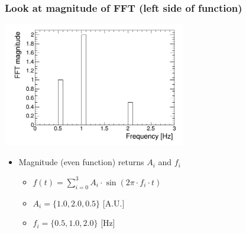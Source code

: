 \documentclass[bigger]{beamer}
\begin{document}
\begin{frame}
\frametitle{Look at magnitude of FFT (left side of function)}
\label{sec-2-1-3}
\label{sec-2-1-3-1}

\centering
\includegraphics[width=0.6\textwidth]{fig/tutorial_FFT_magnitude_scaled.png}
\begin{itemize}

\item Magnitude (even function) returns \(A_{i}\) and \(f_{i}\)
\label{sec-2-1-3-2}%
\begin{itemize}

\item \(f(t) = \sum_{i = 0}^3 A_{i} \cdot \sin (2\pi \cdot f_{i} \cdot t)\)
\label{sec-2-1-3-2-1}%

\item \(A_{i} = \{1.0, 2.0, 0.5\}\) [A.U.]
\label{sec-2-1-3-2-2}%

\item \(f_{i} = \{0.5, 1.0, 2.0\}\) [Hz]
\label{sec-2-1-3-2-3}%
\end{itemize} %
\end{itemize} %
\end{frame}
\end{document}
